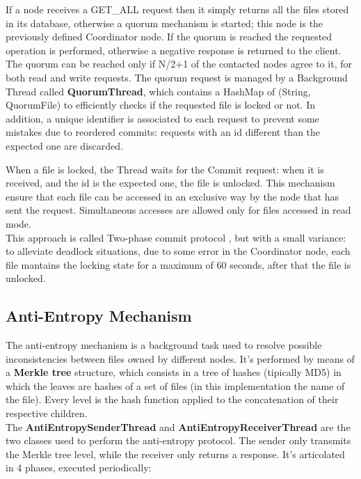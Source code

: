 \documentclass[12pt, a4paper, oneside] {book}
\begin{document}
If a node receives a GET\_ALL request then it simply returns all the files stored in its database, otherwise a quorum mechanism is started; this node is the previously defined Coordinator node.
If the quorum is reached the requested operation is performed, otherwise a negative response is returned to the client.\\
The quorum can be reached only if N/2+1 of the contacted nodes agree to it, for both read and write requests.
The quorum request is managed by a Background Thread called \textbf{QuorumThread},
which contains a HashMap of (String, QuorumFile) to efficiently checks if the requested file is locked or not.
In addition, a unique identifier is associated to each request to prevent some mistakes due to reordered commits: requests with an id different than the expected one are discarded.

When a file is locked, the Thread waits for the Commit request: when it is received, and the id is the expected one, the file is unlocked.
This mechanism ensure that each file can be accessed in an exclusive way by the node that has sent the request. Simultaneous accesses are allowed only for files accessed in read mode.\\
This approach is called Two-phase commit protocol \cite{rif3}, but with a small variance:
to alleviate deadlock situations, due to some error in the Coordinator node, each file mantains the locking state for a maximum of 60 seconds, after that the file is unlocked.

\subsection{Anti-Entropy Mechanism}

The anti-entropy mechanism is a background task used to resolve possible inconsistencies between files owned by different nodes.
It's performed by means of a \textbf{Merkle tree} structure, which consists in a tree of hashes (tipically MD5) in which the leaves are hashes of a set of files (in this implementation the name of the file).
Every level is the hash function applied to the concatenation of their respective children.\\
The \textbf{AntiEntropySenderThread} and \textbf{AntiEntropyReceiverThread} are the two classes used to perform the anti-entropy protocol.
The sender only transmits the Merkle tree level, while the receiver only returns a response.
It's articolated in 4 phases, executed periodically:
\end{document}
